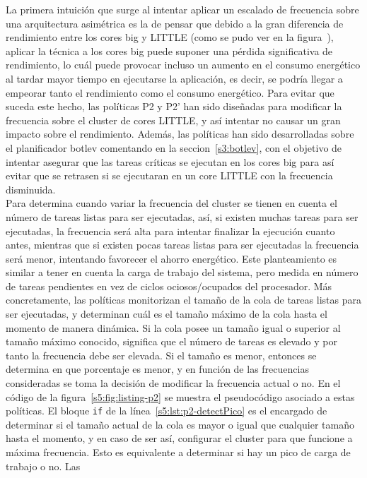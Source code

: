 La primera intuición que surge al intentar aplicar un escalado de
frecuencia sobre una arquitectura asimétrica es la de pensar que debido a
la gran diferencia de rendimiento entre los cores big y LITTLE (como se
pudo ver en la figura~), aplicar la técnica a los cores big puede
suponer una pérdida significativa de rendimiento, lo cuál puede provocar
incluso un aumento en el consumo energético al tardar mayor tiempo en
ejecutarse la aplicación, es decir, se podría llegar a empeorar tanto el
rendimiento como el consumo energético. Para evitar que suceda este hecho,
las políticas P2 y P2' han sido diseñadas para modificar la frecuencia
sobre el cluster de cores LITTLE, y así intentar no causar un gran impacto
sobre el rendimiento. Además, las políticas han sido desarrolladas sobre el
planificador botlev comentando en la seccion~\ref{s3:botlev}, con el
objetivo de intentar asegurar que las tareas críticas se ejecutan en los
cores big para así evitar que se retrasen si se ejecutaran en un core
LITTLE con la frecuencia disminuida.\\
Para determina cuando variar la frecuencia del cluster se tienen en cuenta
el número de tareas listas para ser ejecutadas, así, si existen muchas
tareas para ser ejecutadas, la frecuencia será alta para intentar finalizar
la ejecución cuanto antes, mientras que si existen pocas tareas listas para
ser ejecutadas la frecuencia será menor, intentando favorecer el ahorro
energético. Este planteamiento es similar a tener en cuenta la carga de
trabajo del sistema, pero medida en número de tareas pendientes en vez de
ciclos ociosos/ocupados del procesador. Más concretamente, las políticas
monitorizan el tamaño de la cola de tareas listas para ser ejecutadas, y
determinan cuál es el tamaño máximo de la cola hasta el momento de manera
dinámica. Si la cola posee un tamaño igual o superior al tamaño máximo
conocido, significa que el número de tareas es elevado y por tanto la
frecuencia debe ser elevada. Si el tamaño es menor, entonces se determina
en que porcentaje es menor, y en función de las frecuencias consideradas se
toma la decisión de modificar la frecuencia actual o no. En el código de la
figura~\ref{s5:fig:listing-p2} se muestra el pseudocódigo asociado a estas
políticas. El bloque \texttt{if} de la línea~\ref{s5:lst:p2-detectPico} es
el encargado de determinar si el tamaño actual de la cola es mayor o igual
que cualquier tamaño hasta el momento, y en caso de ser así, configurar el
cluster para que funcione a máxima frecuencia. Esto es equivalente a
determinar si hay un pico de carga de trabajo o no. Las
